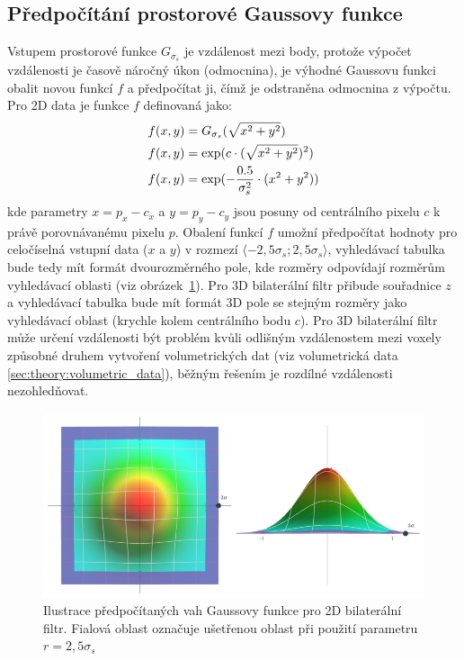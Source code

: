 \subsection*{Předpočítání prostorové Gaussovy funkce}
Vstupem prostorové funkce $G_{\sigma_s}$ je  vzdálenost mezi body, protože výpočet vzdálenosti je časově náročný úkon (odmocnina), je výhodné Gaussovu funkci obalit novou funkcí $f$ a předpočítat ji, čímž je odstraněna odmocnina z výpočtu. Pro 2D data je funkce $f$ definovaná jako:
\begin{align}
    \centering
    \label{eq:bl_space_lookup}
    f(x, y) &= G_{\sigma_s}(\sqrt{x^2 + y^2}) \\
    f(x, y) &= \exp(c \cdot (\sqrt{x^2 + y^2})^2) \\
    f(x, y) &= \exp(-\frac{0.5}{\sigma_s^2} \cdot (x^2 + y^2))
\end{align}
kde parametry $x = p_x - c_x$ a $y = p_y - c_y $ jsou posuny od centrálního pixelu $c$ k právě porovnávanému pixelu $p$. Obalení funkcí $f$ umožní předpočítat hodnoty pro celočíselná vstupní data ($x$ a $y$) v rozmezí $\langle-2,5\sigma_s;2,5\sigma_s\rangle$, vyhledávací tabulka bude tedy mít formát dvourozměrného pole, kde rozměry odpovídají rozměrům vyhledávací oblasti (viz obrázek~\ref{fig:bf:3d_gauss}). Pro 3D bilaterální filtr přibude souřadnice $z$ a vyhledávací tabulka bude mít formát 3D pole se stejným rozměry jako vyhledávací oblast (krychle kolem centrálního bodu $c$). Pro 3D bilaterální filtr může určení vzdálenosti být problém kvůli odlišným vzdálenostem mezi voxely způsobné druhem vytvoření volumetrických dat (viz volumetrická data \ref{sec:theory:volumetric_data}), běžným řešením je rozdílné vzdálenosti nezohledňovat. 

\begin{figure} [H]
    \centering
    \label{fig:bf:3d_gauss}
    \includegraphics[width=1\textwidth]{figures/bf-3d-gauss-1.png}
    \caption{Ilustrace předpočítaných vah Gaussovy funkce pro 2D bilaterální filtr. Fialová oblast označuje ušetřenou oblast při použití parametru $r = 2,5\sigma_s$}
\end{figure}

